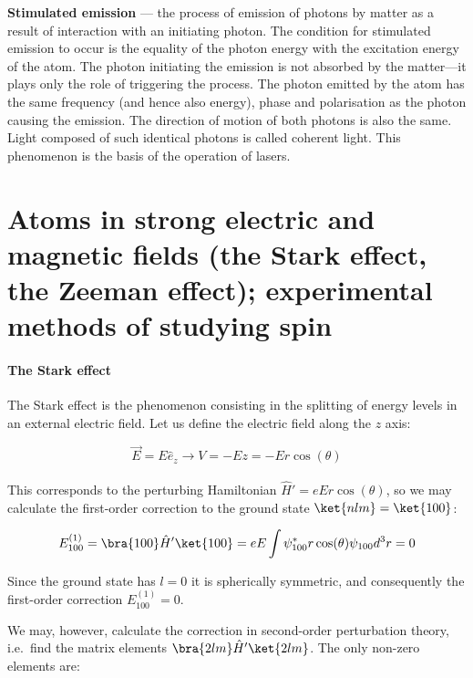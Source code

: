 \textbf{Stimulated emission} --- the process of emission of photons by matter as a result of interaction with an initiating photon. The condition for stimulated emission to occur is the equality of the photon energy with the excitation energy of the atom. The photon initiating the emission is not absorbed by the matter---it plays only the role of triggering the process. The photon emitted by the atom has the same frequency (and hence also energy), phase and polarisation as the photon causing the emission. The direction of motion of both photons is also the same. Light composed of such identical photons is called coherent light. This phenomenon is the basis of the operation of lasers.

\section{Atoms in strong electric and magnetic fields (the Stark effect, the Zeeman effect); experimental methods of studying spin}

\paragraph{The Stark effect}

The Stark effect is the phenomenon consisting in the splitting of energy levels in an external electric field. Let us define the electric field along the $z$ axis:

\begin{equation}
    \vec{E} = E\hat{e}_z \xrightarrow[]{} V = -Ez = -Er\cos(\theta)
\end{equation}

This corresponds to the perturbing Hamiltonian $\hat{H}' = eEr\cos(\theta)$, so we may calculate the first-order correction to the ground state $\ket{nlm} = \ket{100}$:

\begin{equation}
    E^{(1)}_{100} = \bra{100}\hat{H}'\ket{100} = eE\int\psi^*_{100}r\cos(\theta)\psi_{100}d^3r = 0
\end{equation}

Since the ground state has $l=0$ it is spherically symmetric, and consequently the first-order correction $E^{(1)}_{100} = 0$.

We may, however, calculate the correction in second-order perturbation theory\merr, i.e.\ find the matrix elements $\bra{2lm}\hat{H}'\ket{2lm}$. The only non-zero elements are:

